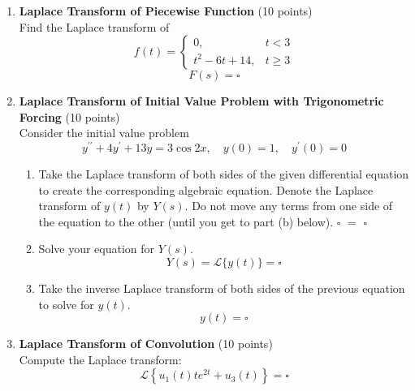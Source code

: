 \begin{enumerate}
  \item \textbf{Laplace Transform of Piecewise Function} (10 points)\\
  Find the Laplace transform of
  $$
  f(t)= \begin{cases}0, & t<3 \\ t^2-6 t+14, & t \geq 3\end{cases}
  $$
  $$
  F(s)=\square
  $$
  \begin{subanswer}
  \end{subanswer}

  \item \textbf{Laplace Transform of Initial Value Problem with Trigonometric Forcing} (10 points)\\
  Consider the initial value problem
  $$
  y^{\prime \prime}+4 y^{\prime}+13 y=3 \cos 2 x, \quad y(0)=1, \quad y^{\prime}(0)=0
  $$
  \begin{enumerate}[label=(\alph*)]
    \item Take the Laplace transform of both sides of the given differential 
    equation to create the corresponding algebraic equation. Denote the 
    Laplace transform of $y(t)$ by $Y(s)$. Do not move any terms from 
    one side of the equation to the other (until you get to part (b) below).
    $\square$ $=$ $\square$
    \begin{subanswer}
    \end{subanswer}
    \item Solve your equation for $Y(s)$.
    $$
    Y(s)=\mathcal{L}\{y(t)\}=\square
    $$
    \begin{subanswer}
    \end{subanswer}
    \item Take the inverse Laplace transform of both sides of the previous equation to solve for $y(t)$.
    $$
    y(t)=\square
    $$
    \begin{subanswer}
    \end{subanswer}
  \end{enumerate}

  \item \textbf{Laplace Transform of Convolution} (10 points)\\
  Compute the Laplace transform:
  $$
  \mathcal{L}\left\{u_1(t) t e^{2 t}+u_3(t)\right\}=\square
  $$
  \begin{subanswer}
  \end{subanswer}




\end{enumerate}
